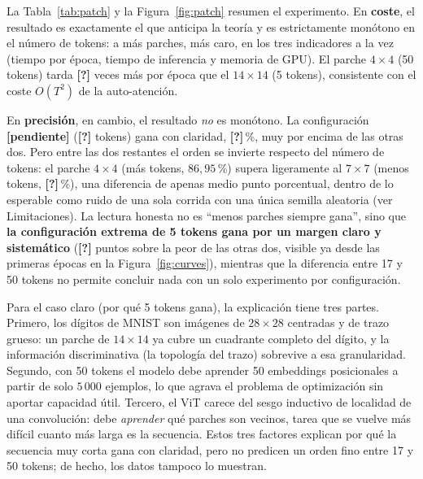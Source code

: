 \documentclass[11pt,a4paper]{article}
\providecommand{\KpiBestPatch}{\textbf{[pendiente]}}
\providecommand{\KpiBestTokens}{\textbf{[?]}}
\providecommand{\KpiBestAcc}{\textbf{[?]}}
\providecommand{\KpiWorstAcc}{\textbf{[?]}}
\providecommand{\KpiAccGap}{\textbf{[?]}}
\providecommand{\KpiEpochRatio}{\textbf{[?]}}
\begin{document}
\begin{table}[h]
  \centering\small
  \caption{Comparación completa por tamaño de parche. Subconjunto de $5\,000$
           imágenes de entrenamiento y $2\,000$ de test, 15 épocas, batch 64,
           AdamW con learning rate $10^{-3}$.}
  \label{tab:patch}
  
\end{table}

La Tabla~\ref{tab:patch} y la Figura~\ref{fig:patch} resumen el experimento. En
\textbf{coste}, el resultado es exactamente el que anticipa la teoría y es
estrictamente monótono en el número de tokens: a más parches, más caro, en los
tres indicadores a la vez (tiempo por época, tiempo de inferencia y memoria de
GPU). El parche $4\times4$ (50 tokens) tarda \KpiEpochRatio{} veces más por
época que el $14\times14$ (5 tokens), consistente con el coste $O(T^2)$ de la
auto-atención.

En \textbf{precisión}, en cambio, el resultado \emph{no} es monótono. La
configuración \KpiBestPatch{} (\KpiBestTokens{} tokens) gana con claridad,
\KpiBestAcc\,\%, muy por encima de las otras dos. Pero entre las dos restantes
el orden se invierte respecto del número de tokens: el parche $4\times4$ (más
tokens, $86{,}95$\,\%) supera ligeramente al $7\times7$ (menos tokens,
\KpiWorstAcc\,\%), una diferencia de apenas medio punto porcentual, dentro
de lo esperable como ruido de una sola corrida con una única semilla aleatoria
(ver Limitaciones). La lectura honesta no es ``menos parches siempre gana'',
sino que \textbf{la configuración extrema de 5 tokens gana por un margen claro
y sistemático} (\KpiAccGap{} puntos sobre la peor de las otras dos, visible ya
desde las primeras épocas en la Figura~\ref{fig:curves}), mientras que la
diferencia entre 17 y 50 tokens no permite concluir nada con un solo experimento
por configuración.

Para el caso claro (por qué 5 tokens gana), la explicación tiene tres
partes. Primero, los dígitos de MNIST son imágenes de $28\times28$ centradas y
de trazo grueso: un parche de $14\times14$ ya cubre un cuadrante completo del
dígito, y la información discriminativa (la topología del trazo) sobrevive a
esa granularidad. Segundo, con 50 tokens el modelo debe aprender 50 embeddings
posicionales a partir de solo $5\,000$ ejemplos, lo que agrava el problema de
optimización sin aportar capacidad útil. Tercero, el ViT carece del sesgo
inductivo de localidad de una convolución: debe \emph{aprender} qué parches son
vecinos, tarea que se vuelve más difícil cuanto más larga es la secuencia. Estos
tres factores explican por qué la secuencia muy corta gana con claridad, pero no
predicen un orden fino entre 17 y 50 tokens; de hecho, los datos tampoco lo
muestran.
\end{document}
